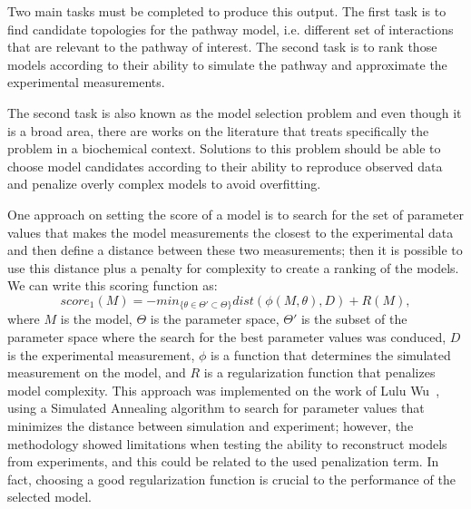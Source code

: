 Two main tasks must be completed to produce this output. The first task
is to find candidate topologies for the pathway model, i.e. different
set of interactions that are relevant to the pathway of interest. The
second task is to rank those models according to their ability to 
simulate the pathway and approximate the experimental measurements.


The second task is also known as the model selection problem and even
though it is a broad area, there are works on the literature that treats 
specifically the problem in a biochemical context. Solutions to this 
problem should be able to choose model candidates according to their 
ability to reproduce observed data and penalize overly complex models 
to avoid overfitting. 

One approach on setting the score of a model is to search for the set of 
parameter values that makes the model measurements the closest to the 
experimental data and then define a distance between these two 
measurements; then it is possible to use this distance plus a penalty 
for complexity to create a ranking of the models. We can write this 
scoring function as:
\begin{equation*}
    score_1 (M) = - min_{\{\theta \in \Theta' \subset \Theta\}}  
        dist (\phi(M, \theta), D) + R (M),
\end{equation*}
where $M$ is the model, $\Theta$ is the parameter space, $\Theta'$ is 
the subset of the parameter space where the search for the best 
parameter values was conduced, $D$ is the experimental measurement,
$\phi$ is a function that determines the simulated measurement on the 
model, and $R$ is a regularization function that penalizes model 
complexity. This approach was implemented on the work of Lulu 
Wu~\cite{Wu15}, using a Simulated Annealing algorithm to search for 
parameter values that minimizes the distance between simulation and 
experiment; however, the methodology showed limitations when testing the 
ability to reconstruct models from experiments, and this could be 
related to the used penalization term. In fact, choosing a good 
regularization function is crucial to the performance of the selected 
model.

